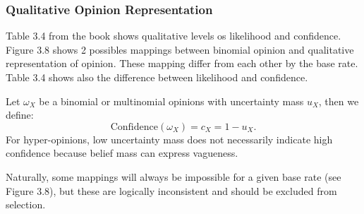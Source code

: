 \subsubsection{Qualitative Opinion Representation}

Table 3.4 from the book shows qualitative levels os likelihood and confidence. Figure 3.8 shows 2 possibles mappings between binomial opinion and qualitative representation of opinion. These mapping differ from each other by the base rate. Table 3.4 shows also the difference between likelihood and confidence.

Let $\omega_X$ be a binomial or multinomial opinions with uncertainty mass $u_X$, then we define:
\begin{equation}
    \mathrm{Confidence}(\omega_X) = c_X = 1 - u_X\text{.}
\end{equation}
For hyper-opinions, low uncertainty mass does not necessarily indicate high confidence because belief mass can express vagueness.

Naturally, some mappings will
always be impossible for a given base rate (see Figure 3.8), but these are logically
inconsistent and should be excluded from selection.
